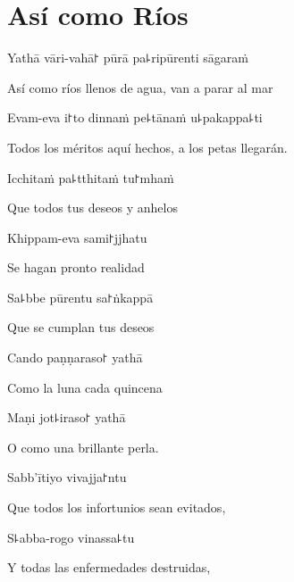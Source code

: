 \chapter{Así como Ríos}


Yathā vāri-vahā꜓ pūrā pa꜕ripūrenti sāgaraṁ

\begin{english}
  Así como ríos llenos de agua, van a parar al mar
\end{english}

Evam-eva i꜓to dinnaṁ pe꜕tānaṁ u꜕pakappa꜕ti

\begin{english}
  Todos los méritos aquí hechos, a los petas llegarán.
\end{english}

Icchitaṁ pa꜕tthitaṁ tu꜓mhaṁ

\begin{english}
  Que todos tus deseos y anhelos
\end{english}

Khippam-eva sami꜓jjhatu

\begin{english}
  Se hagan pronto realidad
\end{english}

Sa꜕bbe pūrentu sa꜓ṅkappā

\begin{english}
  Que se cumplan tus deseos
\end{english}

Cando paṇṇaraso꜓ yathā

\begin{english}
  Como la luna cada quincena
\end{english}

Maṇi jot꜕iraso꜓ yathā

\begin{english}
  O como una brillante perla.
\end{english}

Sabb'ītiyo vivajja꜓ntu

\begin{english}
  Que todos los infortunios sean evitados,
\end{english}

S꜕abba-rogo vinassa꜕tu

\begin{english}
  Y todas las enfermedades destruidas,
\end{english}

